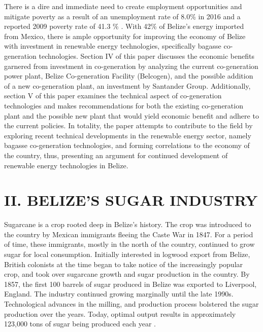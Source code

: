 \documentclass[twocolumn,10pt]{asme2e}
\begin{document}
There is a dire and immediate need to create employment opportunities and mitigate poverty as a result of an unemployment rate of 8.0\% in 2016 and a reported 2009 poverty rate of 41.3 \% \cite{sib_pop}. With 42\% of Belize's energy imported from Mexico, there is ample opportunity for improving the economy of Belize with investment in renewable energy technologies, specifically bagasse co-generation technologies. Section IV of this paper discusses the economic benefits garnered from investment in co-generation by analyzing the current co-generation power plant, Belize Co-generation Facility (Belcogen), and the possible addition of a new co-generation plant, an investment by Santander Group. Additionally, section V of this paper examines the technical aspect of co-generation technologies and makes recommendations for both the existing co-generation plant and the possible new plant that would yield economic benefit and adhere to the current policies. In totality, the paper attempts to contribute to the field by exploring  recent technical developments  in the renewable energy sector, namely bagasse co-generation technologies, and forming correlations to the economy  of the country, thus, presenting an argument for continued development of renewable  energy technologies in Belize. %
\section*{II. BELIZE'S SUGAR INDUSTRY}
Sugarcane is a crop rooted deep in Belize's history. The crop was introduced to the country by Mexican immigrants fleeing the Caste War in 1847. For a period of time, these immigrants, mostly in the north of the country, continued to grow sugar for local consumption. Initially interested in logwood export from Belize, British colonists at the time began to take notice of the increasingly popular crop, and took over sugarcane growth and sugar production in the country. By 1857, the first 100 barrels of sugar produced in Belize was exported to Liverpool, England. The industry continued growing marginally until the late 1990s. Technological advances in the milling, and production process bolstered the sugar production over the years. Today, optimal output results in approximately 123,000 tons of sugar being produced each year \cite{phd_belizesugar}.
\end{document}
